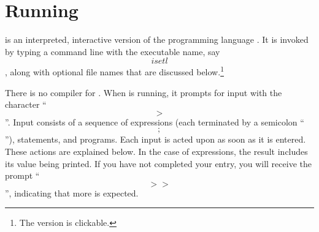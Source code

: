 
\section{Running \ISETL{}}

\ISETL{} is an interpreted, interactive version of the programming language
\SETL\@.
It is invoked by typing a command line with
the executable name, say \[isetl\], along with optional file
names that are discussed below.\footnote{The  version
is clickable.  
}

There is no compiler for \ISETL{}\@.
When \ISETL{} is running,
it prompts for input with the character ``\[>\]''.
Input consists of a sequence of expressions
(each terminated by a semicolon ``\[;\]''), statements, and programs.
Each input is acted upon as soon as it is entered.
These actions are explained below.
In the case of expressions,
the result includes its value being printed.
If you have not completed your entry,
you will receive the prompt ``\[>>\]'',
indicating that more is expected.

